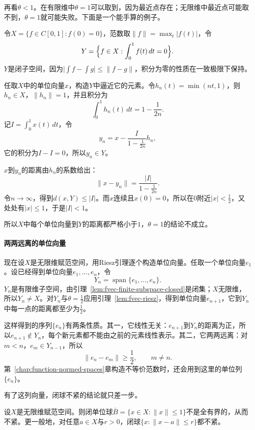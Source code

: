 再看$\theta<1$。在有限维中$\theta=1$可以取到，因为最近点存在；无限维中最近点可能取不到，$\theta=1$就可能失败。下面是一个能手算的例子。

\begin{example}[$\theta=1$可能失败]
\label{ex:fvec-riesz-theta-one}
令$X=\{f\in C[0,1]:f(0)=0\}$，范数取$\lVert f\rVert=\max_t\lvert f(t)\rvert$，令
\[
 Y=\Bigl\{f\in X:\int_0^1f(t)\,dt=0\Bigr\}.
\]
$Y$是闭子空间，因为$\lvert\int f-\int g\rvert\leq\lVert f-g\rVert$，积分为零的性质在一致极限下保持。

任取$X$中的单位向量$x$，构造$Y$中逼近它的元素。令$h_n(t)=\min(nt,1)$，则$h_n\in X$，$\lVert h_n\rVert=1$，并且积分为
\[
 \int_0^1h_n(t)\,dt=1-\frac1{2n}.
\]
记$I=\int_0^1x(t)\,dt$，令
\[
 y_n=x-\frac{I}{1-\frac1{2n}}h_n,
\]
它的积分为$I-I=0$，所以$y_n\in Y$。

$x$到$y_n$的距离由$h_n$的系数给出：
\[
 \lVert x-y_n\rVert=\frac{\lvert I\rvert}{1-\frac1{2n}}.
\]
令$n\to\infty$，得到$d(x,Y)\leq\lvert I\rvert$。而$x$连续且$x(0)=0$，所以在$0$附近$\lvert x\rvert<\tfrac12$，又处处有$\lvert x\rvert\leq1$，于是$\lvert I\rvert<1$。

所以$X$中每个单位向量到$Y$的距离都严格小于$1$，$\theta=1$的结论不成立。
\end{example}

\paragraph{两两远离的单位向量}
现在设$X$是无限维赋范空间，用Riesz引理逐个构造单位向量。任取一个单位向量$e_1$。设已经得到单位向量$e_1,\ldots,e_n$，令
\[
 Y_n=\operatorname{span}\{e_1,\ldots,e_n\}.
\]
$Y_n$是有限维子空间，由引理~\ref{lem:fvec-finite-subspace-closed}是闭集；$X$无限维，所以$Y_n\neq X$。对$Y_n$与$\theta=\tfrac12$应用引理~\ref{lem:fvec-riesz}，得到单位向量$e_{n+1}$，它到$Y_n$中每一点的距离都至少为$\tfrac12$。

这样得到的序列$\{e_n\}$有两条性质。其一，它线性无关：$e_{n+1}$到$Y_n$的距离为正，所以$e_{n+1}\notin Y_n$，每个新元素都不能由之前的元素线性表示。其二，它两两远离：对$m<n$，$e_m\in Y_{n-1}$，所以
\begin{equation}
 \lVert e_n-e_m\rVert\geq\frac12,\qquad m\neq n.
 \label{eq:fvec-separated-sequence}
\end{equation}
第~\ref{chap:function-normed-spaces}章构造不等价范数时，还会用到这里的单位列$\{e_n\}$。

有了这列向量，闭球不紧的结论就只差一步。

\begin{theorem}[无限维闭球不紧]
\label{thm:fvec-closed-ball-noncompact}
设$X$是无限维赋范空间。则闭单位球$\bar B=\{x\in X:\lVert x\rVert\leq1\}$不是全有界的，从而不紧。更一般地，对任意$a\in X$与$r>0$，闭球$\{x:\lVert x-a\rVert\leq r\}$都不紧。
\end{theorem}

